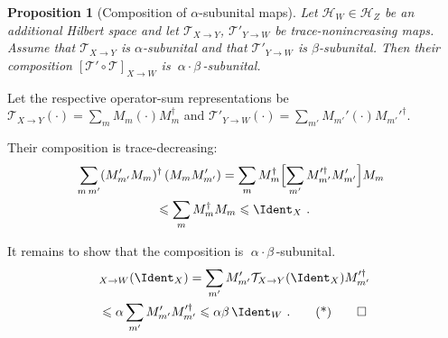 \documentclass[11pt,a4paper]{article}
\theoremstyle{plain}
\newtheorem{prop}[thm]{Proposition}
\def\Hs{\mathscr{H}}%
\newenvironment{myproof}[1][\proofname]{%
  \color{prooftextcolor} \footnotesize \proof[\itshape #1]\hspace*{1.2mm}%
}{\endproof}
\begin{document}
\begin{prop}[Composition of $\alpha$-subunital maps]
  \label{prop:CompositionOfAlphaSubunitalMaps}
  Let $\Hs_W\in\Hs_Z$ be an additional Hilbert space and let $\mathcal{T}_{X\rightarrow Y}$,
  $\mathcal{T}'_{Y\rightarrow W}$ be trace-nonincreasing maps. Assume that $\mathcal{T}_{X\rightarrow Y}$ is
  $\alpha$-subunital and that $\mathcal{T}'_{Y\rightarrow W}$ is $\beta$-subunital. Then their composition
  $\left[\mathcal{T}'\circ\mathcal{T}\right]_{X\rightarrow W}$ is $\:\alpha\cdot\beta\,$-subunital.
\end{prop}
\begin{myproof}[Proof of Prop.~\ref{prop:CompositionOfAlphaSubunitalMaps}]
  Let the respective operator-sum representations be
  $\mathcal{T}_{X\rightarrow Y}(\cdot) = \sum_m M_m \left(\cdot\right) M_m^\dagger$ and
  $\mathcal{T}'_{Y\rightarrow W}(\cdot) = \sum_{m'} M_{m'}' \left(\cdot\right) M_{m'}'^\dagger$.

  Their composition is trace-decreasing:
  \begin{multline*}
    \hspace*{-2mm}\sum_{m\,m'} (M_{m'}' M_m)^\dagger \, (M_m M_{m'}')
    = \sum_m M_m^\dagger \Bigl[ \sum_{m'} M_{m'}'^\dagger M_{m'}' \Bigr] M_m \\
    \leqslant \sum_m M_m^\dagger M_m
    \leqslant \Ident_X\ .
  \end{multline*}

  It remains to show that the composition is $\;\alpha\cdot\beta\,$-subunital.
  \begin{multline*}
    [\mathcal{T}'\circ\mathcal{T}]_{X\rightarrow W}(\Ident_X)
    = \sum_{m'} M_{m'}' \mathcal{T}_{X\rightarrow Y}(\Ident_X) M_{m'}'^\dagger \\
    \leqslant \alpha \sum_{m'} M_{m'}' M_{m'}'^\dagger \leqslant \alpha\beta\,\Ident_W\ . \tag*\qedhere
  \end{multline*}
\end{myproof}
\end{document}
